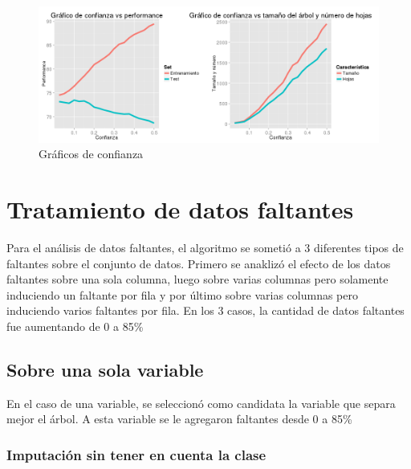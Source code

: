 \documentclass[]{article}
\begin{document}
\begin{figure}
	\includegraphics[scale = 0.2]{Punto_1_Graficos_Mezclados}
	\caption[Confianza vs ajuste]{Gráficos de confianza}
	\label{P1Conf}
\end{figure}
%
%






\section{Tratamiento de datos faltantes}
Para el análisis de datos faltantes, el algoritmo se sometió a 3 diferentes tipos de faltantes sobre el conjunto de datos. Primero se anaklizó el efecto de los datos faltantes sobre una sola columna, luego sobre varias columnas pero solamente induciendo un faltante por fila y por último sobre varias columnas pero induciendo varios faltantes por fila. En los 3 casos, la cantidad de datos faltantes fue aumentando de 0 a 85\%

\subsection{Sobre una sola variable}
En el caso de una variable, se seleccionó como candidata la variable que separa mejor el árbol. A esta variable se le agregaron faltantes desde 0 a 85\%

\subsubsection{Imputación sin tener en cuenta la clase}
\end{document}
